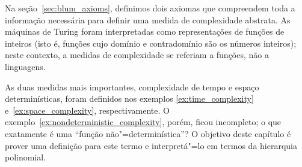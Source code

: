 Na seção~\ref{sec:blum_axioms},
definimos dois axiomas que compreendem toda a informação necessária
para definir uma medida de complexidade abstrata.
As máquinas de Turing foram interpretadas como
representações de funções de inteiros
(isto é, funções cujo domínio e contradomínio são os números inteiros);
neste contexto,
a medidas de complexidade
se referiam a funções, não a linguagens.

As duas medidas mais importantes,
complexidade de tempo e espaço determinísticas,
foram definidos nos exemplos
\ref{ex:time_complexity} e~\ref{ex:space_complexity},
respectivamente.
O exemplo~\ref{ex:nondeterministic_complexity},
porém,
ficou incompleto;
o que exatamente é uma ``função não"=determinística''?
O objetivo deste capítulo é prover uma definição para este termo
e interpretá"=lo em termos da hierarquia polinomial.
